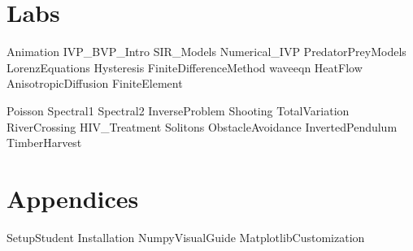 \documentclass[opener-c,labs,green,nociteref]{HJnewsiambook}
\begin{document}
\part{Labs}
{Animation}
{IVP_BVP_Intro}
{SIR_Models}
{Numerical_IVP} 
{PredatorPreyModels}
{LorenzEquations}
{Hysteresis}
{FiniteDifferenceMethod}
{waveeqn}
{HeatFlow}
{AnisotropicDiffusion}
{FiniteElement}

{Poisson}
{Spectral1}
{Spectral2}
{InverseProblem}
{Shooting}
{TotalVariation}
{RiverCrossing}
{HIV_Treatment}
{Solitons}
{ObstacleAvoidance}
{InvertedPendulum}
{TimberHarvest}

\part{Appendices}
\begin{appendices}
{SetupStudent}
{Installation}
{NumpyVisualGuide}
{MatplotlibCustomization}
\end{appendices}



\end{document}
